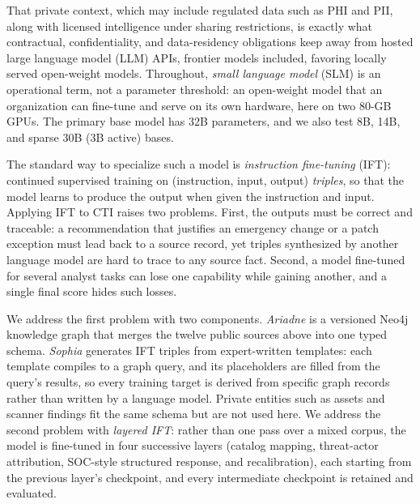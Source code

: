\documentclass[conference]{IEEEtran}
\begin{document}
That private context, which may include regulated data such as PHI and PII, along with licensed intelligence under sharing restrictions, is exactly what contractual, confidentiality, and data-residency obligations keep away from hosted large language model (LLM) APIs, frontier models included, favoring locally served open-weight models. Throughout, \emph{small language model} (SLM) is an operational term, not a parameter threshold: an open-weight model that an organization can fine-tune and serve on its own hardware, here on two 80-GB GPUs. The primary base model has 32B parameters, and we also test 8B, 14B, and sparse 30B (3B active) bases.

The standard way to specialize such a model is \emph{instruction fine-tuning} (IFT): continued supervised training on (instruction, input, output) \emph{triples}, so that the model learns to produce the output when given the instruction and input. Applying IFT to CTI raises two problems. First, the outputs must be correct and traceable: a recommendation that justifies an emergency change or a patch exception must lead back to a source record, yet triples synthesized by another language model are hard to trace to any source fact. Second, a model fine-tuned for several analyst tasks can lose one capability while gaining another, and a single final score hides such losses.

We address the first problem with two components. \emph{Ariadne} is a versioned Neo4j knowledge graph that merges the twelve public sources above into one typed schema. \emph{Sophia} generates IFT triples from expert-written templates: each template compiles to a graph query, and its placeholders are filled from the query's results, so every training target is derived from specific graph records rather than written by a language model. Private entities such as assets and scanner findings fit the same schema but are not used here. We address the second problem with \emph{layered IFT}: rather than one pass over a mixed corpus, the model is fine-tuned in four successive layers (catalog mapping, threat-actor attribution, SOC-style structured response, and recalibration), each starting from the previous layer's checkpoint, and every intermediate checkpoint is retained and evaluated.
\end{document}

